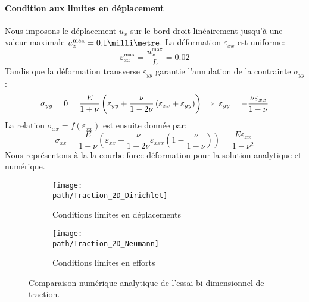 \documentclass[10pt]{book}
\def\path{./fig}
\begin{document}
\paragraph{Condition aux limites en déplacement}
Nous imposons le déplacement $u_{x}$ sur le bord droit linéairement jusqu'à une valeur maximale $u_{x}^{\max}=0.1\milli\metre$. La déformation $\varepsilon_{xx}$ est uniforme:
$$\varepsilon_{xx}^{\max} = \dfrac{u_{x}^{\max}}{L} = 0.02$$
Tandis que la déformation transverse $\varepsilon_{yy}$ garantie l'annulation de la contrainte $\sigma_{yy}$:
$$\sigma_{yy}=0=\dfrac{E}{1+\nu}\left(\varepsilon_{yy}+\dfrac{\nu}{1-2\nu}\left(\varepsilon_{xx}+\varepsilon_{yy}\right)\right)\; \Rightarrow \; \varepsilon_{yy}=-\dfrac{\nu\varepsilon_{xx}}{1-\nu}$$
La relation $\sigma_{xx}=f(\varepsilon_{xx})$ est ensuite donnée par:
$$\sigma_{xx}=\dfrac{E}{1+\nu}\left(\varepsilon_{xx}+\dfrac{\nu}{1-2\nu}\varepsilon_{xxx}\left(1-\dfrac{\nu}{1-\nu}\right)\right)=\dfrac{E\varepsilon_{xx}}{1-\nu^{2}}$$
Nous représentons à la  la courbe force-déformation pour la solution analytique et numérique.
\begin{figure}[h!]
\begin{subfigure}[b]{0.49\textwidth}
\centering \texttt{[image: \\path/Traction\_2D\_Dirichlet]}
\caption{Conditions limites en déplacements}
\label{fig:traction_2D_plane_strain_dep}
\end{subfigure}
\begin{subfigure}[b]{0.49\textwidth}
\centering \texttt{[image: \\path/Traction\_2D\_Neumann]}
\caption{Conditions limites en efforts}
\label{fig:traction_2D_plane_strain_F}
\end{subfigure}
\caption{Comparaison numérique-analytique de l'essai bi-dimensionnel de traction.}
\label{fig:traction_2D_plane_strain}
\end{figure}
\end{document}
